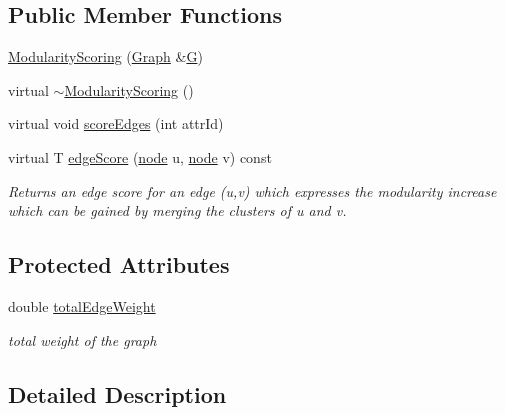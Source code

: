 \subsection*{Public Member Functions}
\begin{DoxyCompactItemize}
\item 
\hyperlink{class_ensemble_clustering_1_1_modularity_scoring_a1cd9db9b1331604cbe3b4a3e6fd76f30}{Modularity\-Scoring} (\hyperlink{class_ensemble_clustering_1_1_graph}{Graph} \&\hyperlink{class_ensemble_clustering_1_1_edge_scoring_a5f44e943d8b0609bb7e866d785502300}{G})
\item 
virtual \hyperlink{class_ensemble_clustering_1_1_modularity_scoring_a0ba3b54465a84dfb360fc5fc2819bc59}{$\sim$\-Modularity\-Scoring} ()
\item 
virtual void \hyperlink{class_ensemble_clustering_1_1_modularity_scoring_ae98a672a41a6f5d8e0b84c96b2d30b0a}{score\-Edges} (int attr\-Id)
\item 
virtual T \hyperlink{class_ensemble_clustering_1_1_modularity_scoring_ab8f469274771dda801a75df49f8d27c6}{edge\-Score} (\hyperlink{namespace_ensemble_clustering_ae829290aeccd1a420b17a37fd901f114}{node} u, \hyperlink{namespace_ensemble_clustering_ae829290aeccd1a420b17a37fd901f114}{node} v) const 
\begin{DoxyCompactList}\small\item\em Returns an edge score for an edge (u,v) which expresses the modularity increase which can be gained by merging the clusters of u and v. \end{DoxyCompactList}\end{DoxyCompactItemize}
\subsection*{Protected Attributes}
\begin{DoxyCompactItemize}
\item 
double \hyperlink{class_ensemble_clustering_1_1_modularity_scoring_adb7d45c3830ff06335256898bbbaaf7c}{total\-Edge\-Weight}
\begin{DoxyCompactList}\small\item\em total weight of the graph \end{DoxyCompactList}\end{DoxyCompactItemize}


\subsection{Detailed Description}
